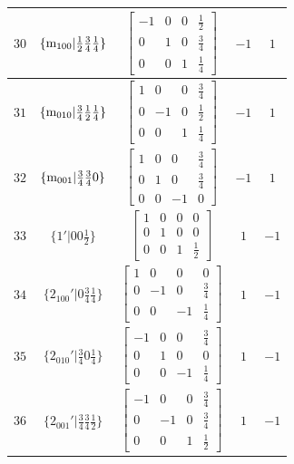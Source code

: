 \documentclass[fleqn,8pt]{jsarticle}
\begin{document}
\begin{longtable}{ccccc}
$ 30 $ & $ \{{\rm m}_{100}|\frac{1}{2} \frac{3}{4} \frac{1}{4}\} $ & $ \begin{bmatrix} -1 & 0 & 0 & \frac{1}{2} \\ 0 & 1 & 0 & \frac{3}{4} \\ 0 & 0 & 1 & \frac{1}{4} \end{bmatrix} $ & $ -1 $ & $ 1 $ \\ \hline
$ 31 $ & $ \{{\rm m}_{010}|\frac{3}{4} \frac{1}{2} \frac{1}{4}\} $ & $ \begin{bmatrix} 1 & 0 & 0 & \frac{3}{4} \\ 0 & -1 & 0 & \frac{1}{2} \\ 0 & 0 & 1 & \frac{1}{4} \end{bmatrix} $ & $ -1 $ & $ 1 $ \\ \hline
$ 32 $ & $ \{{\rm m}_{001}|\frac{3}{4} \frac{3}{4} 0\} $ & $ \begin{bmatrix} 1 & 0 & 0 & \frac{3}{4} \\ 0 & 1 & 0 & \frac{3}{4} \\ 0 & 0 & -1 & 0 \end{bmatrix} $ & $ -1 $ & $ 1 $ \\ \hline
$ 33 $ & $ \{1{}'|0 0 \frac{1}{2}\} $ & $ \begin{bmatrix} 1 & 0 & 0 & 0 \\ 0 & 1 & 0 & 0 \\ 0 & 0 & 1 & \frac{1}{2} \end{bmatrix} $ & $ 1 $ & $ -1 $ \\ \hline
$ 34 $ & $ \{2{}_{100}{}'|0 \frac{3}{4} \frac{1}{4}\} $ & $ \begin{bmatrix} 1 & 0 & 0 & 0 \\ 0 & -1 & 0 & \frac{3}{4} \\ 0 & 0 & -1 & \frac{1}{4} \end{bmatrix} $ & $ 1 $ & $ -1 $ \\ \hline
$ 35 $ & $ \{2{}_{010}{}'|\frac{3}{4} 0 \frac{1}{4}\} $ & $ \begin{bmatrix} -1 & 0 & 0 & \frac{3}{4} \\ 0 & 1 & 0 & 0 \\ 0 & 0 & -1 & \frac{1}{4} \end{bmatrix} $ & $ 1 $ & $ -1 $ \\ \hline
$ 36 $ & $ \{2{}_{001}{}'|\frac{3}{4} \frac{3}{4} \frac{1}{2}\} $ & $ \begin{bmatrix} -1 & 0 & 0 & \frac{3}{4} \\ 0 & -1 & 0 & \frac{3}{4} \\ 0 & 0 & 1 & \frac{1}{2} \end{bmatrix} $ & $ 1 $ & $ -1 $ \\ \hline

\end{longtable}
\end{document}
